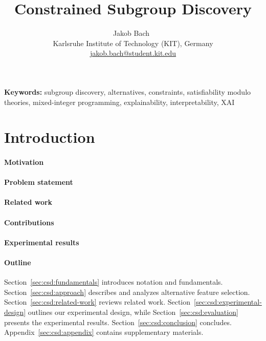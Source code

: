 \documentclass{article}
\title{
	Constrained Subgroup Discovery
}
\author{
	Jakob Bach~\orcidlink{0000-0003-0301-2798}\\
	\small Karlsruhe Institute of Technology (KIT), Germany\\
	\small \href{mailto:jakob.bach@student.kit.edu}{jakob.bach@student.kit.edu}
}
\date{} %
\theoremstyle{definition}
\begin{document}
\maketitle

\begin{abstract}
\end{abstract}
%
\textbf{Keywords:} subgroup discovery, alternatives, constraints, satisfiability modulo theories, mixed-integer programming, explainability, interpretability, XAI

\section{Introduction}
\label{sec:csd:introduction}

\paragraph{Motivation}

\cite{carvalho2019machine} \cite{molnar2020interpretable}

\paragraph{Problem statement}

\paragraph{Related work}

\paragraph{Contributions}

\paragraph{Experimental results}

\paragraph{Outline}

Section~\ref{sec:csd:fundamentals} introduces notation and fundamentals.
Section~\ref{sec:csd:approach} describes and analyzes alternative feature selection.
Section~\ref{sec:csd:related-work} reviews related work.
Section~\ref{sec:csd:experimental-design} outlines our experimental design, while Section~\ref{sec:csd:evaluation} presents the experimental results.
Section~\ref{sec:csd:conclusion} concludes.
Appendix~\ref{sec:csd:appendix} contains supplementary materials.
\end{document}
